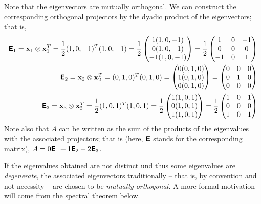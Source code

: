 {Note that the eigenvectors are mutually orthogonal.
We can construct the corresponding orthogonal projectors by the dyadic product
of the eigenvectors; that is,
\begin{equation}
\begin{split}
\textsf{\textbf{E}}_1 =
{\bf x}_1 \otimes {\bf x}_1^T =
\frac{1}{2} (1,0,-1)^T(1,0,-1) =
\frac{1}{2}
\begin{pmatrix}
1(1,0,-1)\\
0(1,0,-1)\\
-1(1,0,-1)
\end{pmatrix} =
\frac{1}{2}
\begin{pmatrix}
1&0&-1\\
0&0&0\\
-1&0&1
\end{pmatrix}
\\
\textsf{\textbf{E}}_{2} =
{\bf x}_{2} \otimes {\bf x}_{2}^T =
 (0,1,0)^T(0,1,0) =
\begin{pmatrix}
0(0,1,0)\\
1(0,1,0)\\
0(0,1,0)
\end{pmatrix} =
\begin{pmatrix}
0&0&0\\
0&1&0\\
0&0&0
\end{pmatrix}
\\
\textsf{\textbf{E}}_{3} =
{\bf x}_{3} \otimes {\bf x}_{3}^T =
\frac{1}{2} (1,0,1)^T(1,0,1) =
\frac{1}{2}
\begin{pmatrix}
1(1,0,1)\\
0(1,0,1)\\
1(1,0,1)
\end{pmatrix} =
\frac{1}{2}
\begin{pmatrix}
1&0&1\\
0&0&0\\
1&0&1
\end{pmatrix}
\end{split}
\end{equation}
Note also that $A$ can be written as the sum of the products of the
eigenvalues with the associated projectors; that is (here, $\textsf{\textbf{E}}$
stands for the corresponding matrix),
$A= 0  \textsf{\textbf{E}}_1 + 1  \textsf{\textbf{E}}_{2} +2\textsf{\textbf{E}}_{3} $.
{\textrm{\eexample}}
}

If the eigenvalues obtained are not distinct und thus some eigenvalues are {\em degenerate},
the associated eigenvectors traditionally -- that is, by convention and not necessity -- are chosen to be
{\em mutually orthogonal.}
A more formal motivation will come from the spectral theorem below.


